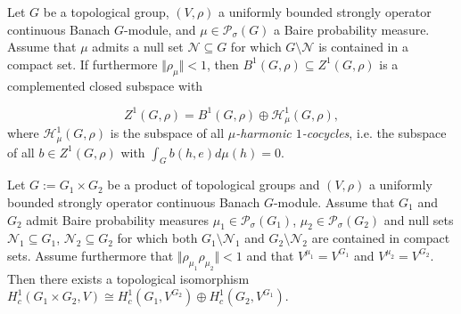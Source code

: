 \documentclass[10pt,a4paper]{amsart}
\begin{document}
\begin{proposition} \label{PiotrResult} Let $G$ be a topological group, $(V,\rho)$ a uniformly bounded strongly operator continuous Banach $G$-module, and $\mu\in\mathcal{P}_{\sigma}(G)$ a Baire probability measure. Assume that $\mu$ admits a null set $\mathcal{N}\subseteq G$ for which $G\setminus\mathcal{N}$ is contained in a compact set. If furthermore $\Vert\rho_{\mu}\Vert<1$, then $B^{1}(G,\rho)\subseteq Z^{1}(G,\rho)$ is a complemented closed subspace with

\[
Z^{1}(G,\rho)=B^{1}(G,\rho)\oplus\mathcal{H}_{\mu}^{1}(G,\rho),
\]
where $\mathcal{H}_{\mu}^{1}(G,\rho)$ is the subspace of all \emph{$\mu$-harmonic $1$-cocycles}, i.e. the subspace of all $b\in Z^{1}(G,\rho)$ with $\int_{G}b(h,e)d\mu(h)=0$. \end{proposition}

\begin{theorem} \label{NowakDirectProduct} Let $G:=G_{1}\times G_{2}$ be a product of topological groups and $(V,\rho)$ a uniformly bounded strongly operator continuous Banach $G$-module. Assume that $G_{1}$ and $G_{2}$ admit Baire probability measures $\mu_{1}\in\mathcal{P}_{\sigma}(G_{1})$, $\mu_{2}\in\mathcal{P}_{\sigma}(G_{2})$ and null sets $\mathcal{N}_{1}\subseteq G_{1}$, $\mathcal{N}_{2}\subseteq G_{2}$ for which both $G_{1}\setminus\mathcal{N}_{1}$ and $G_{2}\setminus\mathcal{N}_{2}$ are contained in compact sets. Assume furthermore that $\Vert\rho_{\mu_{1}}\rho_{\mu_{2}}\Vert<1$ and that $V^{\mu_{1}}=V^{G_{1}}$ and $V^{\mu_{2}}=V^{G_{2}}$. Then there exists a topological isomorphism $H_{c}^{1}(G_{1}\times G_{2},V)\cong H_{c}^{1}(G_{1},V^{G_{2}})\oplus H_{c}^{1}(G_{2},V^{G_{1}})$. \end{theorem}
\end{document}
